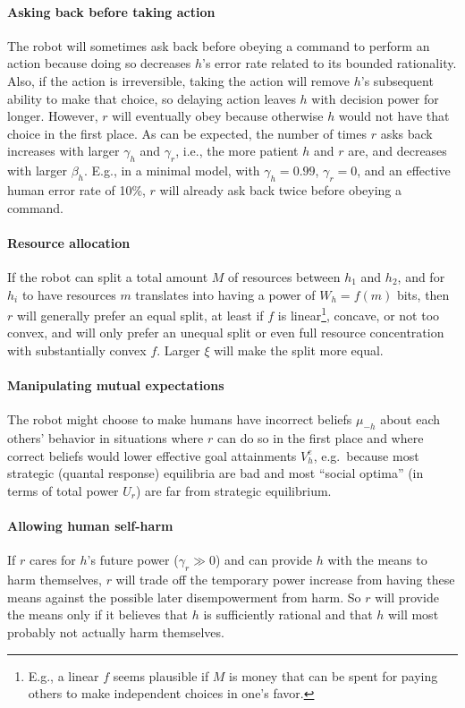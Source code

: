 \documentclass[letterpaper]{article} %
\begin{document}
\paragraph{Asking back before taking action} 
The robot will sometimes ask back before obeying a command to perform an action because doing so decreases $h$'s error rate related to its bounded rationality. 
Also, if the action is irreversible, taking the action will remove $h$'s subsequent ability to make that choice, so delaying action leaves $h$ with decision power for longer. 
However, $r$ will eventually obey because otherwise $h$ would not have that choice in the first place. 
As can be expected, the number of times $r$ asks back increases with larger $\gamma_h$ and $\gamma_r$, i.e., the more patient $h$ and $r$ are, 
and decreases with larger $\beta_h$.
E.g., in a minimal model, with $\gamma_h=0.99$, $\gamma_r=0$, and an effective human error rate of 10\%, 
$r$ will already ask back twice before obeying a command.

\paragraph{Resource allocation}
If the robot can split a total amount $M$ of resources between $h_1$ and $h_2$, 
and for $h_i$ to have resources $m$ translates into having a power of $W_h=f(m)$ bits,
then $r$ will generally prefer an equal split, at least if $f$ is linear\footnote{%
    E.g., a linear $f$ seems plausible if $M$ is money that can be spent for paying others to make independent choices in one's favor.
    }, 
concave, or not too convex,
and will only prefer an unequal split or even full resource concentration with substantially convex $f$.
Larger $\xi$ will make the split more equal.

\paragraph{Manipulating mutual expectations}
The robot might choose to make humans have incorrect beliefs $\mu_{-h}$ about each others' behavior in situations where $r$ can do so in the first place and where correct beliefs would lower effective goal attainments $V^e_h$, e.g.\ because most strategic (quantal response) equilibria are bad and most ``social optima'' (in terms of total power $U_r$) are far from strategic equilibrium.

\paragraph{Allowing human self-harm}
If $r$ cares for $h$'s future power ($\gamma_r\gg 0$) and can provide $h$ with the means to harm themselves, $r$ will trade off the temporary power increase from having these means against the possible later disempowerment from harm. So $r$ will provide the means only if it believes that $h$ is sufficiently rational and that $h$ will most probably not actually harm themselves.
\end{document}
